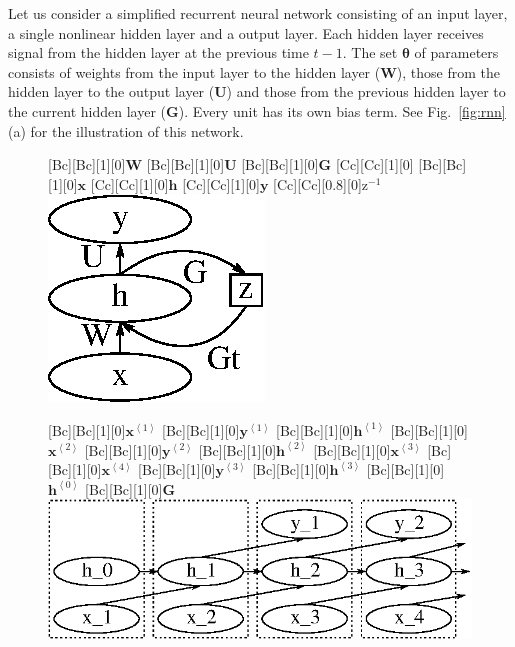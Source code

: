 \documentclass{now}
\newcommand{\qt}[1]{\left<#1\right>}
\newcommand{\vect}[1]{\mathbf{#1}}
\newcommand{\vects}[1]{\boldsymbol{#1}}
\newcommand{\matr}[1]{\mathbf{#1}}
\newcommand{\vh}[0]{\vect{h}}
\newcommand{\vx}[0]{\vect{x}}
\newcommand{\vy}[0]{\vect{y}}
\newcommand{\mW}[0]{\matr{W}}
\newcommand{\mG}[0]{\matr{G}}
\newcommand{\mU}[0]{\matr{U}}
\newcommand{\TT}[0]{{\vects{\theta}}}
\begin{document}
Let us consider a simplified recurrent neural network
consisting of an input layer, a single nonlinear hidden
layer and a output layer. Each hidden layer receives signal
from the hidden layer at the previous time $t-1$. The set
$\TT$ of parameters consists of weights from the input layer
to the hidden layer ($\mW$), those from the hidden layer to
the output layer ($\mU$) and those from the previous hidden
layer to the current hidden layer ($\mG$).  Every unit has
its own bias term. See Fig.~\ref{fig:rnn}(a) for the
illustration of this network.

\begin{figure}[t]
    \begin{minipage}{0.40\textwidth}
        \centering
        [Bc][Bc][1][0]{$\mW$}
        [Bc][Bc][1][0]{$\mU$}
        [Bc][Bc][1][0]{$\mG$}
        [Cc][Cc][1][0]{}
        [Bc][Bc][1][0]{$\vx$}
        [Cc][Cc][1][0]{$\vh$}
        [Cc][Cc][1][0]{$\vy$}
        [Cc][Cc][0.8][0]{$\text{z}^{-1}$}
        \includegraphics[width=0.65\columnwidth]{../figures/rnn.eps}
    \end{minipage}
    \begin{minipage}{0.58\textwidth}
        \centering
        [Bc][Bc][1][0]{$\vx^{\qt{1}}$}
        [Bc][Bc][1][0]{$\vy^{\qt{1}}$}
        [Bc][Bc][1][0]{$\vh^{\qt{1}}$}
        [Bc][Bc][1][0]{$\vx^{\qt{2}}$}
        [Bc][Bc][1][0]{$\vy^{\qt{2}}$}
        [Bc][Bc][1][0]{$\vh^{\qt{2}}$}
        [Bc][Bc][1][0]{$\vx^{\qt{3}}$}
        [Bc][Bc][1][0]{$\vx^{\qt{4}}$}
        [Bc][Bc][1][0]{$\vy^{\qt{3}}$}
        [Bc][Bc][1][0]{$\vh^{\qt{3}}$}
        [Bc][Bc][1][0]{$\vh^{\qt{0}}$}
        [Bc][Bc][1][0]{$\mG$}
        \includegraphics[width=\columnwidth]{../figures/rnn_tf.eps}
    \end{minipage}


\end{figure}
\end{document}
